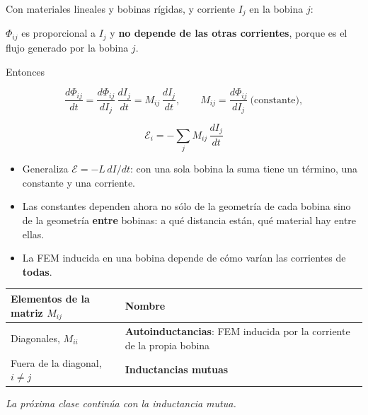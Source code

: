 \documentclass[12pt,a4paper]{article}
\begin{document}
Con materiales lineales y bobinas rígidas, y corriente $I_j$ en la bobina $j$:

\begin{warnbox}[Importante]
$\Phi_{ij}$ es proporcional a $I_j$ y \textbf{no depende de las
otras corrientes}, porque es el flujo generado por la bobina $j$.
\end{warnbox}

Entonces

\[
\frac{d\Phi_{ij}}{dt} = \frac{d\Phi_{ij}}{dI_j}\,\frac{dI_j}{dt} = M_{ij}\,\frac{dI_j}{dt},
\qquad M_{ij} = \frac{d\Phi_{ij}}{dI_j}\ \text{(constante)},
\]

\begin{keybox}
\[
\boxed{\ \mathcal{E}_i = -\sum_j M_{ij}\,\frac{dI_j}{dt}\ }
\]
\end{keybox}

\begin{itemize}
  \item Generaliza $\mathcal{E} = -L\,dI/dt$: con una sola bobina la suma tiene un
  término, una constante y una corriente.
  \item Las constantes dependen ahora no sólo de la geometría de cada bobina sino de
  la geometría \textbf{entre} bobinas: a qué distancia están, qué material hay entre
  ellas.
  \item La FEM inducida en una bobina depende de cómo varían las corrientes de
  \textbf{todas}.
\end{itemize}

\begin{center}
\renewcommand{\arraystretch}{1.35}
\small
\begin{tabularx}{\textwidth}{>{\raggedright\arraybackslash}X>{\raggedright\arraybackslash}X}
\toprule
\textbf{Elementos de la matriz $M_{ij}$} & \textbf{Nombre} \\
\midrule
Diagonales, $M_{ii}$ & \textbf{Autoinductancias}: FEM inducida por la corriente de la propia bobina \\
Fuera de la diagonal, $i\neq j$ & \textbf{Inductancias mutuas} \\
\bottomrule
\end{tabularx}
\end{center}

\noindent\emph{La próxima clase continúa con la inductancia mutua.}
\end{document}
